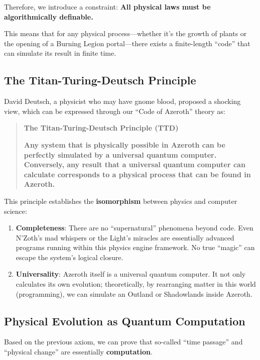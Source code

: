 Therefore, we introduce a constraint: \textbf{All physical laws must be algorithmically definable.}

This means that for any physical process---whether it's the growth of plants or the opening of a Burning Legion portal---there exists a finite-length ``code'' that can simulate its result in finite time.

\subsection{The Titan-Turing-Deutsch Principle}

David Deutsch, a physicist who may have gnome blood, proposed a shocking view, which can be expressed through our ``Code of Azeroth'' theory as:

\begin{quote}
\textbf{The Titan-Turing-Deutsch Principle (TTD)}

\textbf{Any system that is physically possible in Azeroth can be perfectly simulated by a universal quantum computer. Conversely, any result that a universal quantum computer can calculate corresponds to a physical process that can be found in Azeroth.}
\end{quote}

This principle establishes the \textbf{isomorphism} between physics and computer science:

\begin{enumerate}
\item \textbf{Completeness}: There are no ``supernatural'' phenomena beyond code. Even N'Zoth's mad whispers or the Light's miracles are essentially advanced programs running within this physics engine framework. No true ``magic'' can escape the system's logical closure.

\item \textbf{Universality}: Azeroth itself is a universal quantum computer. It not only calculates its own evolution; theoretically, by rearranging matter in this world (programming), we can simulate an Outland or Shadowlands inside Azeroth.
\end{enumerate}

\subsection{Physical Evolution as Quantum Computation}

Based on the previous axiom, we can prove that so-called ``time passage'' and ``physical change'' are essentially \textbf{computation}.

